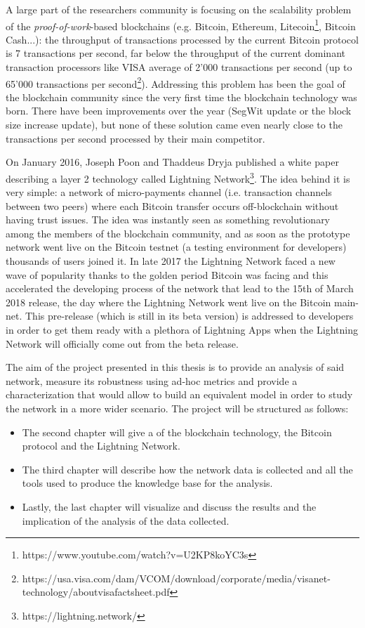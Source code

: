 		A large part of the researchers community is focusing on the scalability problem of the \textit{proof-of-work}-based blockchains (e.g. Bitcoin, Ethereum, Litecoin\footnote{https://www.youtube.com/watch?v=U2KP8koYC3s}, Bitcoin Cash...): the throughput of transactions processed by the current Bitcoin protocol is 7 transactions per second, far below the throughput of the current dominant transaction processors like VISA average of 2'000 transactions per second (up to 65'000 transactions per second\footnote{https://usa.visa.com/dam/VCOM/download/corporate/media/visanet-technology/aboutvisafactsheet.pdf}). Addressing this problem has been the goal of the blockchain community since the very first time the blockchain technology was born. There have been improvements over the year (SegWit update or the block size increase update), but none of these solution came even nearly close to the transactions per second processed by their main competitor.

		On January 2016, Joseph Poon and Thaddeus Dryja published a white paper describing a layer 2 technology called Lightning Network\footnote{https://lightning.network/}. The idea behind it is very simple: a network of micro-payments channel (i.e. transaction channels between two peers) where each Bitcoin transfer occurs off-blockchain without having trust issues. The idea was instantly seen as something revolutionary among the members of the blockchain community, and as soon as the prototype network went live on the Bitcoin testnet (a testing environment for developers) thousands of users joined it. In late 2017 the Lightning Network faced a new wave of popularity thanks to the golden period Bitcoin was facing and this accelerated the developing process of the network that lead to the 15th of March 2018 release, the day where the Lightning Network went live on the Bitcoin main-net. This pre-release (which is still in its beta version) is addressed to developers in order to get them ready with a plethora of Lightning Apps when the Lightning Network will officially come out from the beta release.
		
		The aim of the project presented in this thesis is to provide an analysis of said network, measure its robustness using ad-hoc metrics and provide a characterization that would allow to build an equivalent model in order to study the network in a more wider scenario. The project will be structured as follows:
		\begin{itemize}
			\item The second chapter will give a  of the blockchain technology, the Bitcoin protocol and the Lightning Network.
			\item The third chapter will describe how the network data is collected and all the tools used to produce the knowledge base for the analysis.
			\item Lastly, the last chapter will visualize and discuss the results and the implication of the analysis of the data collected.
		\end{itemize}
